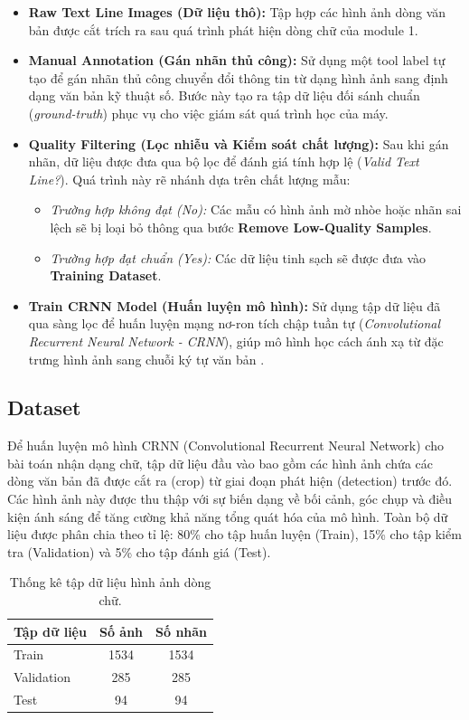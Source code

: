\begin{itemize}
    \item \textbf{Raw Text Line Images (Dữ liệu thô):} Tập hợp các hình ảnh dòng văn bản được cắt trích ra sau quá trình phát hiện dòng chữ của module 1.
    
    \item \textbf{Manual Annotation (Gán nhãn thủ công):} Sử dụng một tool label tự tạo để gán nhãn thủ công chuyển đổi thông tin từ dạng hình ảnh sang định dạng văn bản kỹ thuật số. Bước này tạo ra tập dữ liệu đối sánh chuẩn (\textit{ground-truth}) phục vụ cho việc giám sát quá trình học của máy.
    
    \item \textbf{Quality Filtering (Lọc nhiễu và Kiểm soát chất lượng):} Sau khi gán nhãn, dữ liệu được đưa qua bộ lọc để đánh giá tính hợp lệ (\textit{Valid Text Line?}). Quá trình này rẽ nhánh dựa trên chất lượng mẫu:
    \begin{itemize}
        \item \textit{Trường hợp không đạt (No):} Các mẫu có hình ảnh mờ nhòe hoặc nhãn sai lệch sẽ bị loại bỏ thông qua bước \textbf{Remove Low-Quality Samples}.
        \item \textit{Trường hợp đạt chuẩn (Yes):} Các dữ liệu tinh sạch sẽ được đưa vào \textbf{Training Dataset}.
    \end{itemize}
    
    \item \textbf{Train CRNN Model (Huấn luyện mô hình):} Sử dụng tập dữ liệu đã qua sàng lọc để huấn luyện mạng nơ-ron tích chập tuần tự (\textit{Convolutional Recurrent Neural Network - CRNN}), giúp mô hình học cách ánh xạ từ đặc trưng hình ảnh sang chuỗi ký tự văn bản \cite{Reference5}.
\end{itemize}
\subsection{Dataset}

Để huấn luyện mô hình CRNN (Convolutional Recurrent Neural Network) cho bài toán nhận dạng chữ, tập dữ liệu đầu vào bao gồm các hình ảnh chứa các dòng văn bản đã được cắt ra (crop) từ giai đoạn phát hiện (detection) trước đó. Các hình ảnh này được thu thập với sự biến dạng về bối cảnh, góc chụp và điều kiện ánh sáng để tăng cường khả năng tổng quát hóa của mô hình. Toàn bộ dữ liệu được phân chia theo tỉ lệ: 80\% cho tập huấn luyện (Train), 15\% cho tập kiểm tra (Validation) và 5\% cho tập đánh giá (Test).
\begin{table}[h]
    \centering
    \begin{tabular}{lcc}
        \toprule
        \textbf{Tập dữ liệu} & \textbf{Số ảnh} & \textbf{Số nhãn} \\
        \midrule
        Train      & 1534 & 1534 \\
        Validation & 285  & 285  \\
        Test       & 94  & 94  \\
        \bottomrule
    \end{tabular}
    \caption{Thống kê tập dữ liệu hình ảnh dòng chữ.}
    \label{tab:detection_dataset}
\end{table}

